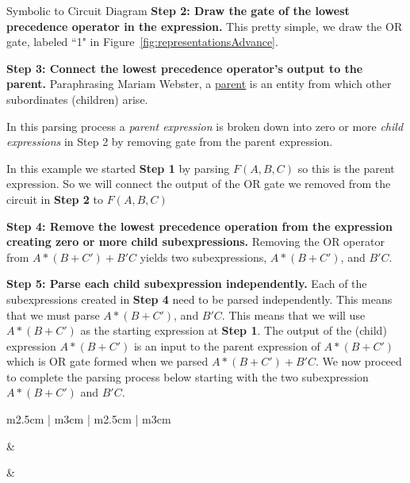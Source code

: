 \begin{process}{Symbolic to Circuit Diagram}
\textbf{Step 2: Draw the gate of the lowest precedence operator in the expression.}
This pretty simple, we draw the OR gate, labeled ``1" in 
Figure~\ref{fig:representationsAdvance}.  

\textbf{Step 3: Connect the lowest precedence operator's output to the parent.}
Paraphrasing Mariam Webster, a 
\href{https://merriam-webster.com/dictionary/parent}{parent} 
is an entity from which other subordinates (children) arise.

In this parsing process a \textit{parent expression} 
is broken down into zero or more \textit{child expressions} 
in Step 2 by removing gate from the parent expression.

In this example we started \textbf{Step 1} by parsing 
$F(A,B,C)$ so this is the parent expression.  So we will connect the output 
of the OR gate we removed from the circuit in \textbf{Step 2} to $F(A,B,C)$

\textbf {Step 4: Remove the lowest precedence operation from the expression 
creating zero or more child subexpressions.}
Removing the OR operator from $A*(B+C')+B'C$ yields two subexpressions, 
$A*(B+C')$, and $B'C$.  

\textbf {Step 5: Parse each child subexpression independently.}
Each of the subexpressions created in \textbf{Step 4} need to be parsed independently.
This means that we must parse $A*(B+C')$, and $B'C$.  This means that we will 
use $A*(B+C')$ as the starting expression at \textbf{Step 1}.  The output of the
(child) expression $A*(B+C')$ is an input to the parent expression of $A*(B+C')$
which is OR gate formed when we parsed $A*(B+C')+B'C$.  We now proceed to 
complete the parsing process below starting with the two subexpression
$A*(B+C')$	and $B'C$.
\vspace{0.2cm}

\begin{tabular}{m{2.5cm} | m{3cm} | m{2.5cm} | m{3cm}}

		& 	 \\ \hline

  &
 \\ \hline


\end{tabular}
\end{process}
